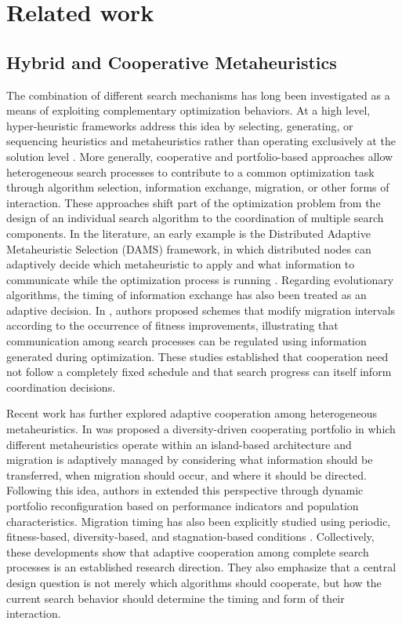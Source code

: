 \documentclass[review]{elsarticle}
\begin{document}
\section{Related work}

\subsection{Hybrid and Cooperative Metaheuristics}
\label{subsec:hybrid_cooperative}

The combination of different search mechanisms has long been investigated as
a means of exploiting complementary optimization behaviors. At a high level,
hyper-heuristic frameworks address this idea by selecting, generating, or
sequencing heuristics and metaheuristics rather than operating exclusively
at the solution level \cite{drake2020recent,dokeroglu2024hyper}. More
generally, cooperative and portfolio-based approaches allow heterogeneous
search processes to contribute to a common optimization task through
algorithm selection, information exchange, migration, or other forms of
interaction. These approaches shift part of the optimization problem from
the design of an individual search algorithm to the coordination of multiple
search components. In the literature, an early example is the Distributed Adaptive Metaheuristic Selection (DAMS) framework, in which distributed nodes can adaptively decide which metaheuristic to apply and what information to communicate while the
optimization process is running \cite{derbel2011-dams}. Regarding evolutionary algorithms, the timing of information exchange has also been treated as an adaptive decision. In \cite{mambrini2015design}, authors proposed schemes that modify migration intervals according to the occurrence of fitness improvements, illustrating that communication among search processes can be regulated using information generated during optimization. These studies established that cooperation need not follow a completely fixed schedule and that search progress can itself inform coordination decisions.

Recent work has further explored adaptive cooperation among heterogeneous
metaheuristics. In \cite{zychowski2025diversity} was proposed a diversity-driven cooperating portfolio in which different metaheuristics operate within an island-based
architecture and migration is adaptively managed by considering what
information should be transferred, when migration should occur, and where it
should be directed. Following this idea, authors in \cite{yao2025adaptive} extended this perspective through dynamic portfolio reconfiguration based on performance indicators and population characteristics. Migration timing has also been explicitly studied using periodic, fitness-based, diversity-based, and stagnation-based
conditions \cite{zychowski2025migration}. Collectively, these developments
show that adaptive cooperation among complete search processes is an
established research direction. They also emphasize that a central design
question is not merely which algorithms should cooperate, but how the
current search behavior should determine the timing and form of their
interaction.
\end{document}
